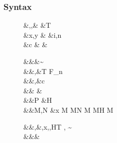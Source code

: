 \documentclass[manuscript,screen,nonacm]{acmart}
\begin{document}



\subsubsection{Syntax}
\begin{figure}[ht]
  \centering
  \begin{syntax}
     &\alpha,\beta,\gamma  &\qquad{} &T \\
     &x,y                  &\qquad{}        &i,n \in {} \\
     &c & &
  \end{syntax}
  \begin{syntax}
         &&\kappa       &\bnfeq \star \bnfor \kappa \to \kappa \bnfor \sigma \sim \tau\\
         &&\tau,\sigma  &\bnfeq \alpha \bnfor T \bnfor \tau \to \tau \bnfor \tau\App\tau \bnfor \Forall {\alpha\co\kappa} \tau \bnfor F_n\\
     &&\nu,\Co      &\bnfeq c \bnfor {}\tau \bnfor \sym\Co \bnfor \trans\nu\Co %
                                        \bnfor \Forall {\alpha\co\kappa} \Co \bnfor \Co\At\tau %
                                        \bnfor \nu\App\Co \bnfor \Left \Co \bnfor \Right \Co\\  %
     && \phi &\bnfeq \tau \bnfor \Co\\
      &&P    &\bnfeq H\App \many{\alpha\co\kappa} \\
         &&M,N  &\bnfeq x \bnfor  {} M \bnfor M\App N \bnfor \TLam{\tau\co\kappa} M \bnfor M\App \tau \bnfor H \bnfor \Case M  \bnfor \Cast \Tm \Co\\

    \end{syntax}
    \begin{syntax}
     &&\TEnv,\Delta &\bnfeq \empt \bnfor \TEnv,x\co\tau \bnfor \TEnv,\alpha\co\kappa \bnfor \TEnv,H\co T \bnfor \TEnv, \gamma \co \tau\sim\sigma\\
      &&\Subst       &\bnfeq \empt \bnfor \Set{\many{\alpha \mapsto \tau}}
  \end{syntax}


\end{figure}
\end{document}
